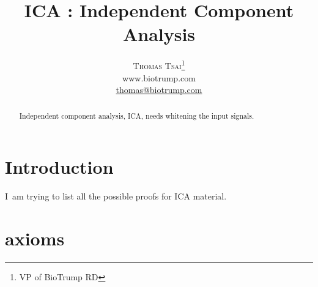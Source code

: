 \documentclass[a4paper,12pt]{article}
\title{\vspace{-15mm}\fontsize{24pt}{10pt}\selectfont\textbf{ICA : Independent Component Analysis}} %
\author{
\large
\textsc{Thomas Tsai}\thanks{VP of BioTrump RD}\\[2mm] %
\normalsize www.biotrump.com \\ %
\normalsize \href{mailto:thomas@biotrump.com}{thomas@biotrump.com} %
\vspace{-5mm}
}
\date{}
\begin{document}
\maketitle %

\thispagestyle{fancy} %


\begin{abstract}

Independent component analysis, ICA, needs whitening the input signals.

\end{abstract}



\section{Introduction}

\lettrine[nindent=0em,lines=3]{I}\ am trying to list all the possible proofs for ICA material.


\section{axioms}
\end{document}
